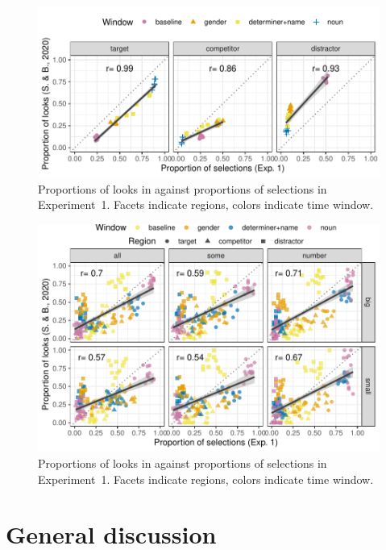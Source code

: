 \documentclass[10pt,letterpaper]{article}
\newcommand{\expref}[1]{Experiment~#1}
\begin{document}
\begin{figure}[H]
\centering
\includegraphics[width=\columnwidth]{../../analysis/SunBreheny/1_incremental/main/graphs/correlations}
\caption{Proportions of looks in  against proportions of selections in \expref{1}. Facets indicate regions, colors indicate time window.} 
\label{fig:results-correlations}
\end{figure}

\begin{figure}[H]
\centering
\includegraphics[width=\columnwidth]{../../analysis/SunBreheny/1_incremental/main/graphs/correlations-bycondition}
\caption{Proportions of looks in  against proportions of selections in \expref{1}. Facets indicate regions, colors indicate time window.} 
\label{fig:results-correlations}
\end{figure}

\section{General discussion}
\end{document}
